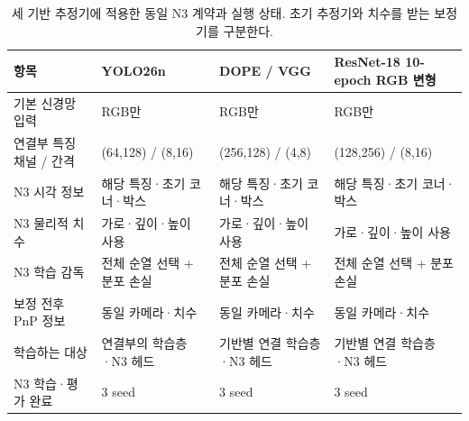 \begin{table}[t]
\centering\footnotesize
\caption{세 기반 추정기에 적용한 동일 N3 계약과 실행 상태. 초기 추정기와 치수를 받는 보정기를 구분한다.}
\label{sup:backbone_contract}
\setlength{\tabcolsep}{4pt}
\begin{tabularx}{\textwidth}{p{}YYY}
\toprule
항목 & YOLO26n & DOPE / VGG & ResNet-18 10-epoch RGB 변형 \\
\midrule
기본 신경망 입력 & RGB만 & RGB만 & RGB만 \\
연결부 특징 채널 / 간격 & (64,128) / (8,16) & (256,128) / (4,8) & (128,256) / (8,16) \\
N3 시각 정보 & 해당 특징·초기 코너·박스 & 해당 특징·초기 코너·박스 & 해당 특징·초기 코너·박스 \\
N3 물리적 치수 & 가로·깊이·높이 사용 & 가로·깊이·높이 사용 & 가로·깊이·높이 사용 \\
N3 학습 감독 & 전체 순열 선택 + 분포 손실 & 전체 순열 선택 + 분포 손실 & 전체 순열 선택 + 분포 손실 \\
보정 전후 PnP 정보 & 동일 카메라·치수 & 동일 카메라·치수 & 동일 카메라·치수 \\
학습하는 대상 & 연결부의 학습층·N3 헤드 & 기반별 연결 학습층·N3 헤드 & 기반별 연결 학습층·N3 헤드 \\
N3 학습·평가 완료 & 3 seed & 3 seed & 3 seed \\
\bottomrule
\end{tabularx}
\end{table}
